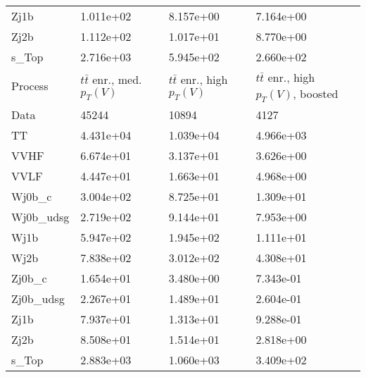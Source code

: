 \begin{table}
{\begin{tabularx}{0.8\textwidth}{|X|X|X|X|}
Zj1b & 1.011e+02 & 8.157e+00 & 7.164e+00 \\
Zj2b & 1.112e+02 & 1.017e+01 & 8.770e+00 \\
s\_Top & 2.716e+03 & 5.945e+02 & 2.660e+02 \\
\hline
\hline
Process & $t\bar{t}$ enr., med. $p_{T}(V)$ & $t\bar{t}$ enr., high $p_{T}(V)$ & $t\bar{t}$ enr., high $p_{T}(V)$, boosted \\
\hline
Data & 45244 & 10894 & 4127 \\
\hline
TT & 4.431e+04 & 1.039e+04 & 4.966e+03 \\
VVHF & 6.674e+01 & 3.137e+01 & 3.626e+00 \\
VVLF & 4.447e+01 & 1.663e+01 & 4.968e+00 \\
Wj0b\_c & 3.004e+02 & 8.725e+01 & 1.309e+01 \\
Wj0b\_udsg & 2.719e+02 & 9.144e+01 & 7.953e+00 \\
Wj1b & 5.947e+02 & 1.945e+02 & 1.111e+01 \\
Wj2b & 7.838e+02 & 3.012e+02 & 4.308e+01 \\
Zj0b\_c & 1.654e+01 & 3.480e+00 & 7.343e-01 \\
Zj0b\_udsg & 2.267e+01 & 1.489e+01 & 2.604e-01 \\
Zj1b & 7.937e+01 & 1.313e+01 & 9.288e-01 \\
Zj2b & 8.508e+01 & 1.514e+01 & 2.818e+00 \\
s\_Top & 2.883e+03 & 1.060e+03 & 3.409e+02 \\
\hline
\end{tabularx}
}
\label{tab:cr-Wen-2017}
\end{table}

